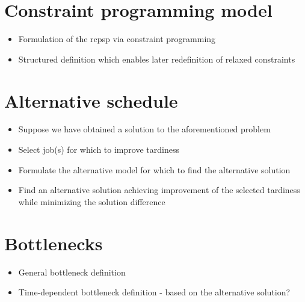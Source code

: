\section{Constraint programming model}

\begin{itemize}
    \item Formulation of the \ac{rcpsp} via constraint programming
    \item Structured definition which enables later redefinition of relaxed constraints
\end{itemize}

\section{Alternative schedule}

\begin{itemize}
    \item Suppose we have obtained a solution to the aforementioned problem
    \item Select job(s) for which to improve tardiness
    \item Formulate the alternative model for which to find the alternative solution
    \item Find an alternative solution achieving improvement of the selected tardiness while
        minimizing the solution difference
\end{itemize}

\section{Bottlenecks}

\begin{itemize}
    \item General bottleneck definition
    \item Time-dependent bottleneck definition - based on the alternative solution?
\end{itemize}

